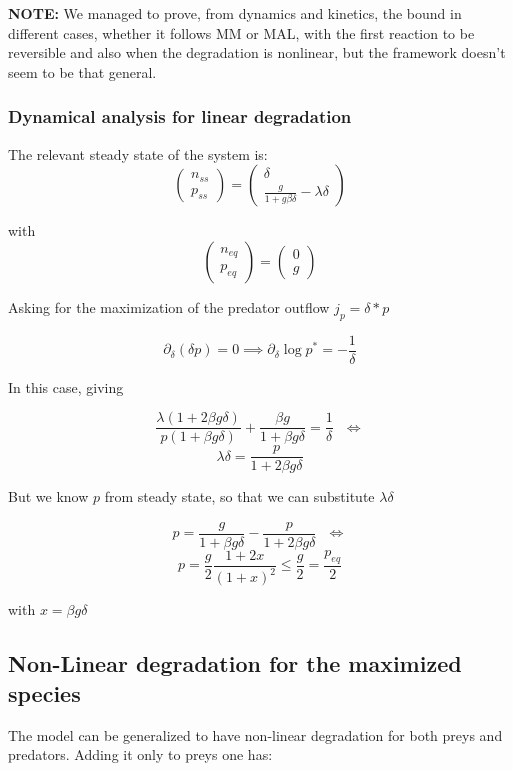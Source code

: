 \documentclass{article}
\begin{document}
	\textbf{NOTE:} We managed to prove, from dynamics and kinetics, the bound in different cases, whether it follows MM or MAL, with the first reaction to be reversible and also when the degradation is nonlinear, but the framework doesn't seem to be that general.
	
	\subsubsection{Dynamical analysis for linear degradation}
	The relevant steady state of the system is:
	$$\begin{pmatrix}
		n_{ss} \\ p_{ss}
	\end{pmatrix}=\begin{pmatrix}
		\delta \\ \frac{g}{1+g \beta \delta}-\lambda \delta
	\end{pmatrix} $$
	
	with
	$$ \begin{pmatrix}
		n_{eq} \\ p_{eq}
	\end{pmatrix}=\begin{pmatrix}
		0 \\ g
	\end{pmatrix} $$
	
	Asking for the maximization of the predator outflow $j_p=\delta*p$
	
	$$\partial_{\delta}(\delta p)=0 \implies \partial_{\delta} \log p^*=-\frac{1}{\delta}$$
	
	In this case, giving
	
	$$\frac{\lambda (1+2\beta g \delta)}{p (1+\beta g \delta)} + \frac{\beta g}{1+ \beta g \delta}=\frac{1}{\delta} 
	\ \ \ \Longleftrightarrow$$$$
	\lambda \delta= \frac{p}{1+2\beta g \delta}$$
	
	But we know $p$ from steady state, so that we can substitute $\lambda \delta $
	
	$$p=\frac{g}{1+ \beta g \delta }-\frac{p}{1+ 2 \beta g \delta }
	\ \ \  \Longleftrightarrow$$$$
	p=\frac{g}{2}  \frac{1+2x}{(1+x)^2} \le \frac{g}{2}=\frac{p_{eq}}{2}$$
	
	with $x= \beta g \delta$
	
	\subsection{Non-Linear degradation for the maximized species}
	The model can be generalized to have non-linear degradation for both preys and predators. Adding it only to preys one has:
	
\end{document}
